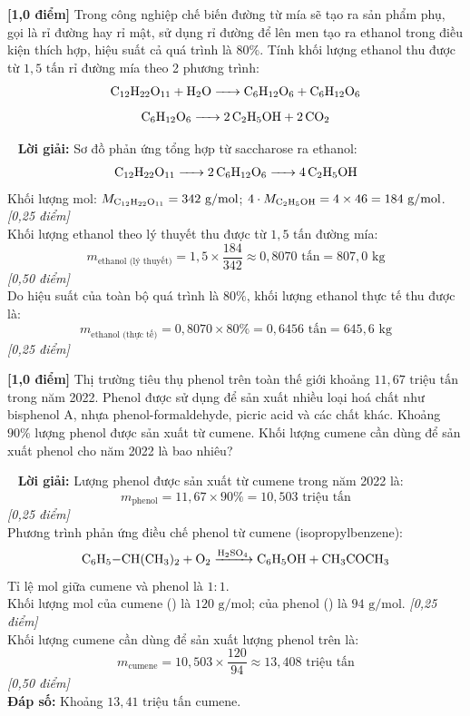 \documentclass[12pt,a4paper]{article}
\renewcommand{\loigiai}[1]{%
  \par\smallskip\noindent{\color{blue!80!black}\textbf{Lời giải:}}\ #1\par\smallskip
}
\begin{document}
\begin{ex}
\textbf{[1,0 điểm]} Trong công nghiệp chế biến đường từ mía sẽ tạo ra sản phẩm phụ, gọi là rỉ đường hay rỉ mật, sử dụng rỉ đường để lên men tạo ra ethanol trong điều kiện thích hợp, hiệu suất cả quá trình là $80\%$. Tính khối lượng ethanol thu được từ $1{,}5\text{ tấn}$ rỉ đường mía theo 2 phương trình:
$$\ce{C12H22O11 + H2O -> C6H12O6 + C6H12O6}$$
$$\ce{C6H12O6 -> 2C2H5OH + 2CO2}$$
\loigiai{
\textbf{Lời giải:}
Sơ đồ phản ứng tổng hợp từ saccharose ra ethanol:
$$\ce{C12H22O11 -> 2 C6H12O6 -> 4 C2H5OH}$$
Khối lượng mol: $M_{\ce{C12H22O11}} = 342\text{ g/mol}$; $4 \cdot M_{\ce{C2H5OH}} = 4 \times 46 = 184\text{ g/mol}$. \hfill \textit{[0,25 điểm]}\\
Khối lượng ethanol theo lý thuyết thu được từ $1{,}5\text{ tấn}$ đường mía:
$$m_{\text{ethanol (lý thuyết)}} = 1{,}5 \times \frac{184}{342} \approx 0{,}8070\text{ tấn} = 807{,}0\text{ kg}$$ \hfill \textit{[0,50 điểm]}\\
Do hiệu suất của toàn bộ quá trình là $80\%$, khối lượng ethanol thực tế thu được là:
$$m_{\text{ethanol (thực tế)}} = 0{,}8070 \times 80\% = 0{,}6456\text{ tấn} = 645{,}6\text{ kg}$$ \hfill \textit{[0,25 điểm]}
}
\end{ex}

\begin{ex}
\textbf{[1,0 điểm]} Thị trường tiêu thụ phenol trên toàn thế giới khoảng $11{,}67\text{ triệu tấn}$ trong năm 2022. Phenol được sử dụng để sản xuất nhiều loại hoá chất như bisphenol A, nhựa phenol-formaldehyde, picric acid và các chất khác. Khoảng $90\%$ lượng phenol được sản xuất từ cumene. Khối lượng cumene cần dùng để sản xuất phenol cho năm 2022 là bao nhiêu?
\loigiai{
\textbf{Lời giải:}
Lượng phenol được sản xuất từ cumene trong năm 2022 là:
$$m_{\text{phenol}} = 11{,}67 \times 90\% = 10{,}503\text{ triệu tấn}$$ \hfill \textit{[0,25 điểm]}\\
Phương trình phản ứng điều chế phenol từ cumene (isopropylbenzene):
$$\ce{C6H5-CH(CH3)2 + O2 ->[H2SO4] C6H5OH + CH3COCH3}$$
Tỉ lệ mol giữa cumene và phenol là $1 : 1$.\\
Khối lượng mol của cumene (\ce{C9H12}) là $120\text{ g/mol}$; của phenol (\ce{C6H5OH}) là $94\text{ g/mol}$. \hfill \textit{[0,25 điểm]}\\
Khối lượng cumene cần dùng để sản xuất lượng phenol trên là:
$$m_{\text{cumene}} = 10{,}503 \times \frac{120}{94} \approx 13{,}408\text{ triệu tấn}$$ \hfill \textit{[0,50 điểm]}\\
\textbf{Đáp số:} Khoảng $13{,}41\text{ triệu tấn}$ cumene.
}
\end{ex}
\end{document}
